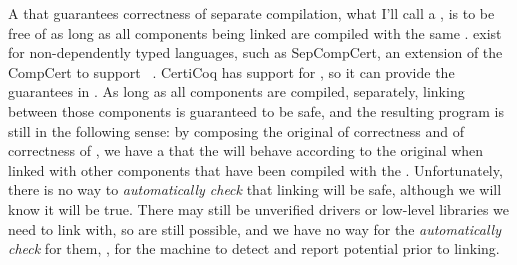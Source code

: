 \FigCertiCoqDiagram

\FigSepCompDiagram
A  that guarantees correctness of separate compilation, what I'll
call a , is
 to be free of
 as long as all components being linked are compiled with
the same .
 exist for non-dependently typed languages, such as
SepCompCert, an extension of the CompCert to support ~\cite{kang2016}.
CertiCoq has support for , so it can provide the
guarantees in .
As long as all components are compiled, separately, linking between those
components is guaranteed to be safe, and the resulting program is still
 in the following sense: by composing the original 
of correctness and  of correctness of ,
we have a  that the  will behave according to the
original  when linked with other  components
that have been compiled with the  .
Unfortunately, there is no way to \emph{automatically check} that linking will
be safe, although we will know it will be true.
There may still be unverified drivers or low-level libraries we need to link
with, so  are still possible, and we have no way for the
\emph{automatically check} for them, \ie, for the machine to detect and report
potential  prior to linking.

